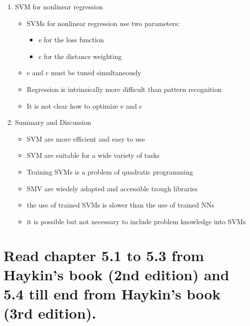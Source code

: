 \documentclass{scrartcl}
\begin{document}
\begin{enumerate}
\item SVM for nonlinear regression 
	\begin{itemize}
	\item SVMs for nonlinear regression use two parameters:
		\begin{itemize}
		\item e for the loss function
		\item c for the distance weighting
		\end{itemize}
	\item e and c must be tuned simultaneously
	\item Regression is intrinsically more difficult than pattern recognition
	\item It is not clear how to optimize e and c
	\end{itemize}


\item Summary and Discussion
	\begin{itemize}
	\item SVM are more efficient and easy to use
	\item SVM are suitable for a wide variety of tasks
	\item Training SVMs is a problem of quadratic programming
	\item SMV are wiedely adapted and accessible trough libraries
	\item the use of trained SVMs is slower than the use of trained NNs
	\item it is possible but not necessary to include problem knowledge into SVMs
	\end{itemize}


\end{enumerate}


\section{Read chapter 5.1 to 5.3 from Haykin’s book (2nd edition) and 5.4 till end from Haykin’s
book (3rd edition).
}
\end{document}

